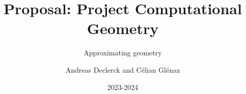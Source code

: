 \documentclass[]{article}
\title{Proposal: Project Computational Geometry}
\subtitle{Approximating geometry}
\author{Andreas Declerck and Célian Glénaz}
\date{2023-2024}
\begin{document}
\maketitle


\nocite{*}
\printbibliography
\end{document}

